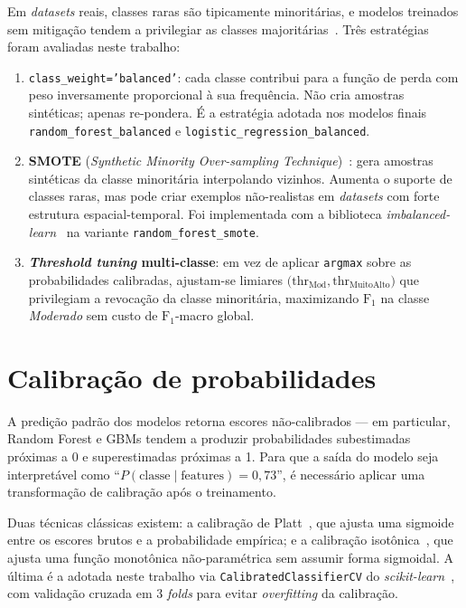 Em \emph{datasets} reais, classes raras são tipicamente minoritárias, e modelos treinados sem mitigação tendem a privilegiar as classes majoritárias~\cite{he2009learning}. Três estratégias foram avaliadas neste trabalho:

\begin{enumerate}
  \item \texttt{class\_weight='balanced'}: cada classe contribui para a função de perda com peso inversamente proporcional à sua frequência. Não cria amostras sintéticas; apenas re-pondera. É a estratégia adotada nos modelos finais \texttt{random\_forest\_balanced} e \texttt{logistic\_regression\_balanced}.

  \item \textbf{SMOTE} (\emph{Synthetic Minority Over-sampling Technique})~\cite{chawla2002smote}: gera amostras sintéticas da classe minoritária interpolando vizinhos. Aumenta o suporte de classes raras, mas pode criar exemplos não-realistas em \emph{datasets} com forte estrutura espacial-temporal. Foi implementada com a biblioteca \emph{imbalanced-learn}~\cite{lemaitre2017imbalanced} na variante \texttt{random\_forest\_smote}.

  \item \textbf{\emph{Threshold tuning} multi-classe}: em vez de aplicar \texttt{argmax} sobre as probabilidades calibradas, ajustam-se limiares \(\bigl(\text{thr}_{\text{Mod}}, \text{thr}_{\text{MuitoAlto}}\bigr)\) que privilegiam a revocação da classe minoritária, maximizando \(\text{F}_1\) na classe \emph{Moderado} sem custo de \(\text{F}_1\)-macro global.
\end{enumerate}

\section{Calibração de probabilidades}
\label{sec:fund_calibracao}

A predição padrão dos modelos retorna escores não-calibrados --- em particular, Random Forest e GBMs tendem a produzir probabilidades subestimadas próximas a 0 e superestimadas próximas a 1. Para que a saída do modelo seja interpretável como ``\(P(\text{classe} \mid \text{features}) = 0{,}73\)'', é necessário aplicar uma transformação de calibração após o treinamento.

Duas técnicas clássicas existem: a calibração de Platt~\cite{platt1999probabilistic}, que ajusta uma sigmoide entre os escores brutos e a probabilidade empírica; e a calibração isotônica~\cite{zadrozny2002transforming}, que ajusta uma função monotônica não-paramétrica sem assumir forma sigmoidal. A última é a adotada neste trabalho via \texttt{CalibratedClassifierCV} do \emph{scikit-learn}~\cite{pedregosa2011scikit}, com validação cruzada em 3 \emph{folds} para evitar \emph{overfitting} da calibração.

